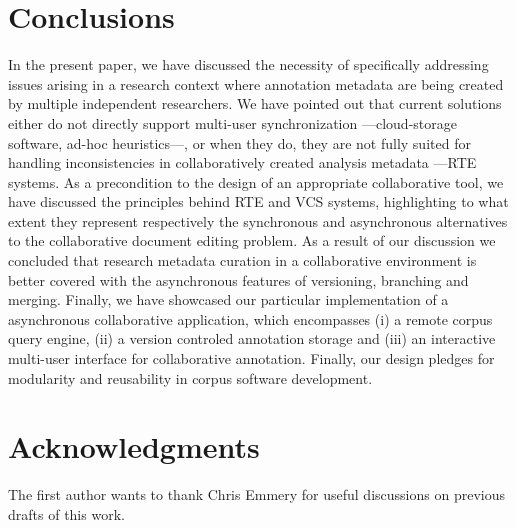 \documentclass{sig-alternate}
\begin{document}
\section{Conclusions}\label{sec:conclusion}
In the present paper, we have discussed the necessity of specifically addressing issues arising
in a research context where annotation metadata are being created by multiple independent researchers.
We have pointed out that current solutions either do not directly support multi-user
synchronization ---cloud-storage software, ad-hoc heuristics---, or when they do, they are not fully
suited for handling inconsistencies in collaboratively created analysis metadata ---RTE systems.
As a precondition to the design of an appropriate collaborative tool, we have discussed the
principles behind RTE and VCS systems, highlighting to what extent they represent respectively
the synchronous and asynchronous alternatives to the collaborative document editing problem.
As a result of our discussion we concluded that research metadata curation in a collaborative
environment is better covered with the asynchronous features of versioning, branching and merging.
Finally, we have showcased our particular implementation of a asynchronous collaborative application,
which encompasses (i) a remote corpus query engine, (ii) a version controled annotation storage
and (iii) an interactive multi-user interface for collaborative annotation. Finally, our design
pledges for modularity and reusability in corpus software development.

\section{Acknowledgments}
The first author wants to thank Chris Emmery for useful discussions on previous drafts of this work. 



%
%

\end{document}
